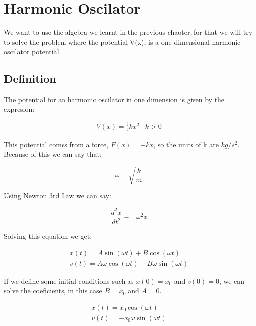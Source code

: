 \setchapterpreamble[u]{\margintoc}
\chapter{Harmonic Oscilator}

We want to use the algebra we learnt in the previous chaoter, for that we will try to solve the problem where the potential V(x), is a one dimensional harmonic oscilator potential.

\section{Definition}

The potential for an harmonic oscilator in one dimension is given by the expresion:

\begin{equation}
  \begin{array}{cc}
    V(x) = \frac{1}{2} k x^2 & k > 0
  \end{array}
\end{equation}

This potential comes from a force, $F(x) = -k x$, so the units of k are $kg/s^2$. Because of this we can say that:

\begin{equation}
  \omega=\sqrt{\frac{k}{m}}
\end{equation}

Using Newton 3rd Law we can say:

\begin{equation}
  \frac{d^2x}{dt^2}= -\omega^2 x
\end{equation}

Solving this equation we get:

\begin{equation}
  \begin{array}{c}
    x(t) = A \sin(\omega t) + B \cos(\omega t)
    \\
    v(t) = A\omega \cos(\omega t) - B\omega \sin(\omega t)
  \end{array}
\end{equation}

If we define some initial conditions such as $x(0)=x_0$ and $v(0)=0$, we can solve the coeficients, in this case $B=x_0$ and $A=0$.

\begin{equation}
  \begin{array}{c}
    x(t) = x_0 \cos(\omega t)
    \\
    v(t) =  - x_0 \omega \sin(\omega t)
  \end{array}
\end{equation}

